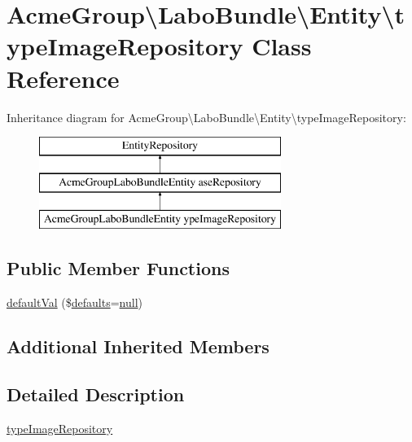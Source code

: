 \hypertarget{class_acme_group_1_1_labo_bundle_1_1_entity_1_1type_image_repository}{\section{Acme\+Group\textbackslash{}Labo\+Bundle\textbackslash{}Entity\textbackslash{}type\+Image\+Repository Class Reference}
\label{class_acme_group_1_1_labo_bundle_1_1_entity_1_1type_image_repository}
}
Inheritance diagram for Acme\+Group\textbackslash{}Labo\+Bundle\textbackslash{}Entity\textbackslash{}type\+Image\+Repository\+:\begin{figure}[H]
\begin{center}
\leavevmode
\includegraphics[height=3.000000cm]{class_acme_group_1_1_labo_bundle_1_1_entity_1_1type_image_repository}
\end{center}
\end{figure}
\subsection*{Public Member Functions}
\begin{DoxyCompactItemize}
\item 
\hyperlink{class_acme_group_1_1_labo_bundle_1_1_entity_1_1type_image_repository_a5562c6af5d72799f401cac563d698e2d}{default\+Val} (\$\hyperlink{model_8defaults_8js_a9114d742403a54e409eca2e2c78bff56}{defaults}=\hyperlink{validate_8js_afb8e110345c45e74478894341ab6b28e}{null})
\end{DoxyCompactItemize}
\subsection*{Additional Inherited Members}


\subsection{Detailed Description}
\hyperlink{class_acme_group_1_1_labo_bundle_1_1_entity_1_1type_image_repository}{type\+Image\+Repository}

